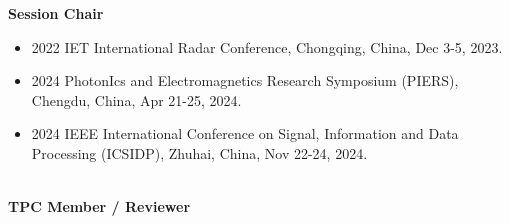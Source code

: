 \documentclass[paper=a4,fontsize=11pt]{scrartcl}
\begin{document}
\textbf{Session Chair} 
\begin{itemize}
	\item 2022 IET International Radar Conference, Chongqing, China, Dec 3-5, 2023.
	\item 2024 PhotonIcs and Electromagnetics Research Symposium (PIERS), Chengdu, China, Apr 21-25, 2024.
	\item 2024 IEEE International Conference on Signal, Information and Data Processing (ICSIDP), Zhuhai, China, Nov 22-24, 2024.
\end{itemize}
~\\
\textbf{TPC Member / Reviewer}
\end{document}
